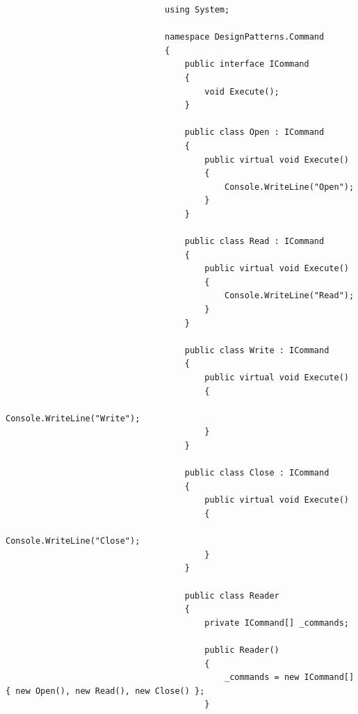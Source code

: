 \documentclass[a4paper,10pt]{article}
\begin{document}
                            \begin{lstlisting}
                                using System;

                                namespace DesignPatterns.Command
                                {
                                    public interface ICommand
                                    {
                                        void Execute();
                                    }
                                
                                    public class Open : ICommand
                                    {
                                        public virtual void Execute()
                                        {
                                            Console.WriteLine("Open");
                                        }
                                    }
                                
                                    public class Read : ICommand
                                    {
                                        public virtual void Execute()
                                        {
                                            Console.WriteLine("Read");
                                        }
                                    }
                                    
                                    public class Write : ICommand
                                    {
                                        public virtual void Execute()
                                        {
                                            Console.WriteLine("Write");
                                        }
                                    }
                                
                                    public class Close : ICommand
                                    {
                                        public virtual void Execute()
                                        {
                                            Console.WriteLine("Close");
                                        }
                                    }
                                
                                    public class Reader
                                    {
                                        private ICommand[] _commands;
                                
                                        public Reader()
                                        {
                                            _commands = new ICommand[] { new Open(), new Read(), new Close() };
                                        }
                                

\end{lstlisting}
\end{document}
